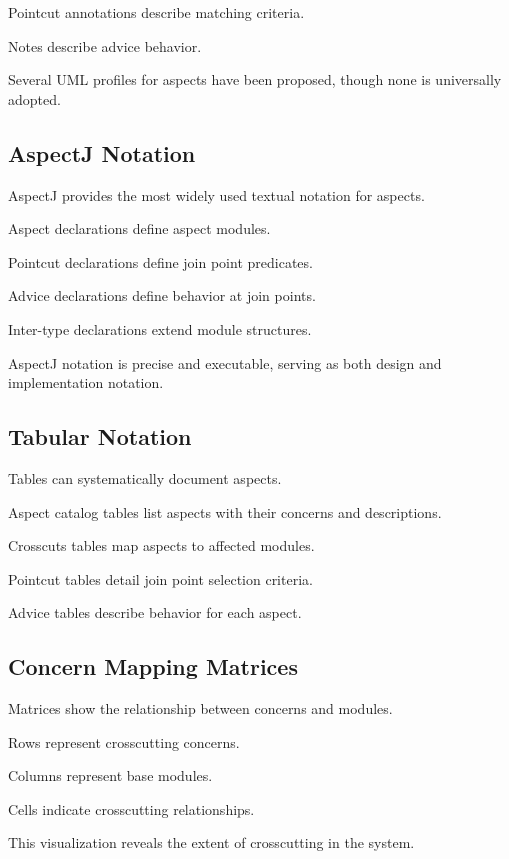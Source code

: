 \documentclass[11pt]{article}
\begin{document}
Pointcut annotations describe matching criteria.

Notes describe advice behavior.

Several UML profiles for aspects have been proposed, though none is universally adopted.

\subsection{AspectJ Notation}

AspectJ provides the most widely used textual notation for aspects.

Aspect declarations define aspect modules.

Pointcut declarations define join point predicates.

Advice declarations define behavior at join points.

Inter-type declarations extend module structures.

AspectJ notation is precise and executable, serving as both design and implementation notation.

\subsection{Tabular Notation}

Tables can systematically document aspects.

Aspect catalog tables list aspects with their concerns and descriptions.

Crosscuts tables map aspects to affected modules.

Pointcut tables detail join point selection criteria.

Advice tables describe behavior for each aspect.

\subsection{Concern Mapping Matrices}

Matrices show the relationship between concerns and modules.

Rows represent crosscutting concerns.

Columns represent base modules.

Cells indicate crosscutting relationships.

This visualization reveals the extent of crosscutting in the system.

\end{document}
